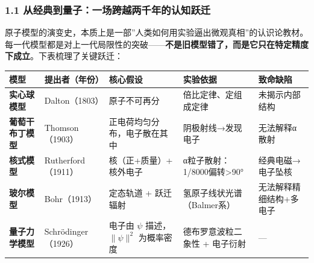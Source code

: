 \documentclass[a4paper,11pt]{ctexart}
\newcounter{none}
\begin{document}
\subsubsection{1.1 从经典到量子：一场跨越两千年的认知跃迁}\label{ux4eceux7ecfux5178ux5230ux91cfux5b50ux4e00ux573aux8de8ux8d8aux4e24ux5343ux5e74ux7684ux8ba4ux77e5ux8dc3ux8fc1}

原子模型的演变史，本质上是一部''人类如何用实验逼出微观真相''的认识论教材。每一代模型都是对上一代局限性的突破------\textbf{不是旧模型错了，而是它只在特定精度下成立}。下表梳理了关键跃迁：

{\def\LTcaptype{none} %
\begin{longtable}[]{@{}
  >{\raggedright\arraybackslash}p{}
  >{\raggedright\arraybackslash}p{}
  >{\raggedright\arraybackslash}p{}
  >{\raggedright\arraybackslash}p{}
  >{\raggedright\arraybackslash}p{}@{}}
\toprule\noalign{}
\begin{minipage}[b]{\linewidth}\raggedright
模型
\end{minipage} & \begin{minipage}[b]{\linewidth}\raggedright
提出者（年份）
\end{minipage} & \begin{minipage}[b]{\linewidth}\raggedright
核心假设
\end{minipage} & \begin{minipage}[b]{\linewidth}\raggedright
实验依据
\end{minipage} & \begin{minipage}[b]{\linewidth}\raggedright
致命缺陷
\end{minipage} \\
\midrule\noalign{}
\endhead
\bottomrule\noalign{}
\endlastfoot
\textbf{实心球模型} & Dalton（1803） & 原子不可再分 & 倍比定律、定组成定律 & 未揭示内部结构 \\
\textbf{葡萄干布丁模型} & Thomson（1903） & 正电荷均匀分布，电子散在其中 & 阴极射线→发现电子 & 无法解释α散射 \\
\textbf{核式模型} & Rutherford（1911） & 核（正+质量）+ 核外电子 & α粒子散射：1/8000偏转\textgreater90° & 经典电磁→电子坠核 \\
\textbf{玻尔模型} & Bohr（1913） & 定态轨道 + 跃迁辐射 & 氢原子线状光谱（Balmer系） & 无法解释精细结构+多电子 \\
\textbf{量子力学模型} & Schrödinger（1926） & 电子由 \(\psi\) 描述，\(\|\psi\|^2\) 为概率密度 & 德布罗意波粒二象性 + 电子衍射 & --- \\
\end{longtable}
}
\end{document}
